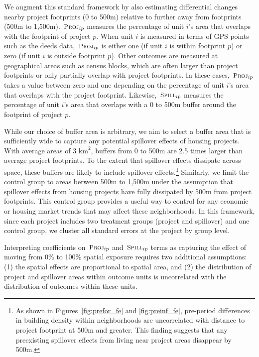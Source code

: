 \documentclass[12pt]{article}
\begin{document}
We augment this standard framework by also estimating differential changes nearby project footprints (0 to 500m) relative to further away from footprints (500m to 1,500m).  $\,\textsc{\small Proj}_{ip}$ measures the percentage of unit $i$'s area that overlaps with the footprint of project $p$.  When unit $i$ is measured in terms of GPS points such as the deeds data, $\,\textsc{\small Proj}_{ip}$ is either one (if unit $i$ is within footprint $p$) or zero (if unit $i$ is outside footprint $p$).  Other outcomes are measured at geographical areas such as census blocks, which are often larger than project footprints or only partially overlap with project footprints.  In these cases, $\,\textsc{\small Proj}_{ip}$ takes a value between zero and one depending on the percentage of unit $i$'s area that overlaps with the project footprint.  Likewise, $\,\textsc{\small Spill}_{ip}$ measures the percentage of unit $i$'s area that overlaps with a 0 to 500m buffer around the footprint of project $p$.  

While our choice of buffer area is arbitrary, we aim to select a buffer area that is sufficiently wide to capture any potential spillover effects of housing projects.  With average areas of 3 $\text{km}^{2}$, buffers from 0 to 500m are 2.5 times larger than average project footprints.  To the extent that spillover effects dissipate across space, these buffers are likely to include spillover effects.\footnote{As shown in Figures~\ref{fig:prefor_fe} and \ref{fig:preinf_fe}, pre-period differences in building density within neighborhoods are uncorrelated with distance to project footprint at 500m and greater.  This finding suggests that any preexisting spillover effects from living near project areas disappear by 500m.}  Similarly, we limit the control group to areas between 500m to 1,500m under the assumption that spillover effects from housing projects have fully dissipated by 500m from project footprints.  This control group provides a useful way to control for any economic or housing market trends that may affect these neighborhoods.  In this framework, since each project includes two treatment groups (project and spillover) and one control group, we cluster all standard errors at the project by group level.

Interpreting coefficients on $\,\textsc{\small Proj}_{ip}$ and $\,\textsc{\small Spill}_{ip}$ terms as capturing the effect of moving from 0\% to 100\% spatial exposure requires two additional assumptions: (1) the spatial effects are proportional to spatial area, and (2) the distribution of project and spillover areas within outcome units is uncorrelated with the distribution of outcomes within these units. %
\end{document}
